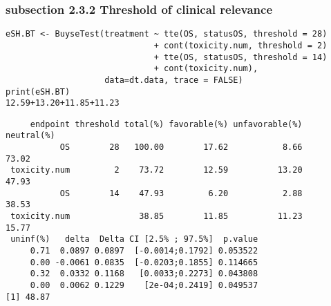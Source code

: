 \documentclass[12pt]{article}
\begin{document}
\subsubsection{subsection 2.3.2 Threshold of clinical relevance}
\label{sec:org10e8484}
\lstset{language=r,label= ,caption= ,captionpos=b,numbers=none}
\begin{lstlisting}
eSH.BT <- BuyseTest(treatment ~ tte(OS, statusOS, threshold = 28)
                              + cont(toxicity.num, threshold = 2)
                              + tte(OS, statusOS, threshold = 14)
                              + cont(toxicity.num),
                    data=dt.data, trace = FALSE)
print(eSH.BT)
12.59+13.20+11.85+11.23
\end{lstlisting}

\begin{verbatim}
     endpoint threshold total(%) favorable(%) unfavorable(%) neutral(%)
           OS        28   100.00        17.62           8.66      73.02
 toxicity.num         2    73.72        12.59          13.20      47.93
           OS        14    47.93         6.20           2.88      38.53
 toxicity.num              38.85        11.85          11.23      15.77
 uninf(%)   delta  Delta CI [2.5% ; 97.5%]  p.value
     0.71  0.0897 0.0897  [-0.0014;0.1792] 0.053522
     0.00 -0.0061 0.0835  [-0.0203;0.1855] 0.114665
     0.32  0.0332 0.1168   [0.0033;0.2273] 0.043808
     0.00  0.0062 0.1229    [2e-04;0.2419] 0.049537
[1] 48.87
\end{verbatim}
\end{document}
